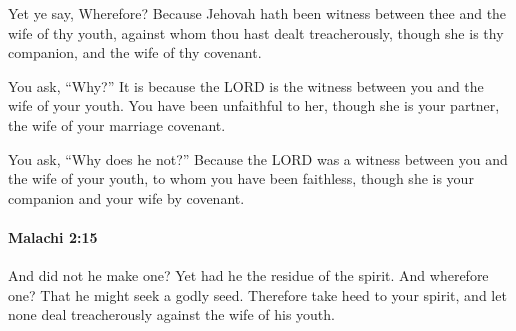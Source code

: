			\begin{versebox}
					\item[BHS] 
					\item[LXX] 
					\item[ASV] Yet ye say, Wherefore? Because Jehovah hath been witness between thee and the wife of thy youth, against whom thou hast dealt treacherously, though she is thy companion, and the wife of thy covenant.
					\item[NIV] You ask, “Why?” It is because the LORD is the witness between you and the wife of your youth. You have been unfaithful to her, though she is your partner, the wife of your marriage covenant.
					\item[NRSV] You ask, “Why does he not?” Because the LORD was a witness between you and the wife of your youth, to whom you have been faithless, though she is your companion and your wife by covenant.
			\end{versebox}

		\paragraph{Malachi 2:15} %
			\label{MALACHI-2-15}

			And did not he make one? Yet had he the residue of the spirit. And wherefore one? That he might seek a godly seed. Therefore take heed to your spirit, and let none deal treacherously against the wife of his youth.


